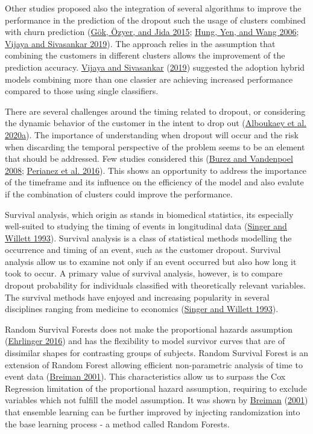 \documentclass[
  12pt,
]{article}
\begin{document}
Other studies proposed also the integration of several algorithms to improve the
performance in the prediction of the dropout such the usage of clusters combined
with churn prediction (\protect\hyperlink{ref-gok_case_2015}{Gök, Özyer, and Jida 2015}; \protect\hyperlink{ref-hung_applying_2006}{Hung, Yen, and Wang 2006}; \protect\hyperlink{ref-vijaya_sivasankar_2019}{Vijaya and Sivasankar 2019}). The approach relies in the assumption that combining
the customers in different clusters allows the improvement of the prediction
accuracy. \protect\hyperlink{ref-vijaya_sivasankar_2019}{Vijaya and Sivasankar} (\protect\hyperlink{ref-vijaya_sivasankar_2019}{2019}) suggested the adoption hybrid models combining
more than one classier are achieving increased performance compared to those
using single classifiers.

There are several challenges around the timing related to dropout, or
considering the dynamic behavior of the customer in the intent to drop out
(\protect\hyperlink{ref-alboukaey_dynamic_2020}{Alboukaey et al. 2020a}). The importance of understanding when dropout will
occur and the risk when discarding the temporal perspective of the problem seems
to be an element that should be addressed. Few studies considered this
(\protect\hyperlink{ref-burez_separating_2008}{Burez and Vandenpoel 2008}; \protect\hyperlink{ref-perianez_churn_2016}{Perianez et al. 2016}). This shows an opportunity to
address the importance of the timeframe and its influence on the efficiency of
the model and also evalute if the combination of clusters could improve the
performance.

Survival analysis, which origin as stands in biomedical statistics, its especially
well-suited to studying the timing of events in longitudinal data (\protect\hyperlink{ref-Singer_Willett_1993}{Singer and Willett 1993}).
Survival analysis is a class of statistical methods modelling the occurrence and timing of
an event, such as the customer dropout.
Survival analysis allow us to examine not only if an event occurred but also how long it
took to occur.
A primary value of survival analysis, however, is to compare dropout probability for
individuals classified with theoretically relevant variables.
The survival methods have enjoyed and increasing popularity in several disciplines ranging
from medicine to economics (\protect\hyperlink{ref-Singer_Willett_1993}{Singer and Willett 1993}).

Random Survival Forests does not make the proportional hazards assumption
(\protect\hyperlink{ref-Ehrlinger_2016}{Ehrlinger 2016}) and has the flexibility to model survivor curves that are of
dissimilar shapes for contrasting groups of subjects. Random Survival Forest is
an extension of Random Forest allowing efficient non-parametric analysis of time
to event data (\protect\hyperlink{ref-Breiman_2001}{Breiman 2001}). This characteristics allow us to surpass the Cox
Regression limitation of the proportional hazard assumption, requiring to
exclude variables which not fulfill the model assumption. It was shown by
\protect\hyperlink{ref-Breiman_2001}{Breiman} (\protect\hyperlink{ref-Breiman_2001}{2001}) that ensemble learning can be further improved by injecting
randomization into the base learning process - a method called Random Forests.
\end{document}
